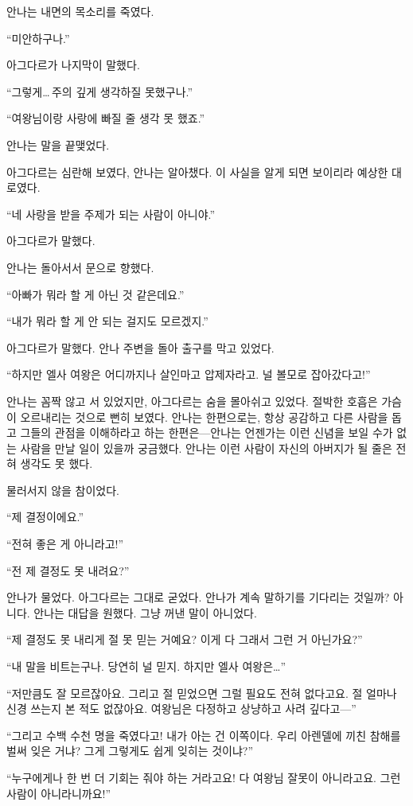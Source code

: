 안나는 내면의 목소리를 죽였다.

``미안하구나.''

아그다르가 나지막이 말했다.

``그렇게\ldots\,주의 깊게 생각하질 못했구나.''

``여왕님이랑 사랑에 빠질 줄 생각 못 했죠.''

안나는 말을 끝맺었다.

아그다르는 심란해 보였다, 안나는 알아챘다. 이 사실을 알게 되면 보이리라 예상한 대로였다.

``네 사랑을 받을 주제가 되는 사람이 아니야.''

아그다르가 말했다.

안나는 돌아서서 문으로 향했다.

``아빠가 뭐라 할 게 아닌 것 같은데요.''

``내가 뭐라 할 게 안 되는 걸지도 모르겠지.''

아그다르가 말했다. 안나 주변을 돌아 출구를 막고 있었다.

``하지만 엘사 여왕은 어디까지나 살인마고 압제자라고. 널 볼모로 잡아갔다고!''

안나는 꼼짝 않고 서 있었지만, 아그다르는 숨을 몰아쉬고 있었다. 절박한 호흡은 가슴이 오르내리는 것으로 뻔히 보였다. 안나는 한편으로는, 항상 공감하고 다른 사람을 돕고 그들의 관점을 이해하라고 하는 한편은—안나는 언젠가는 이런 신념을 보일 수가 없는 사람을 만날 일이 있을까 궁금했다. 안나는 이런 사람이 자신의 아버지가 될 줄은 전혀 생각도 못 했다.

물러서지 않을 참이었다.

``제 결정이에요.''

``전혀 좋은 게 아니라고!''

``전 제 결정도 못 내려요?''

안나가 물었다. 아그다르는 그대로 굳었다. 안나가 계속 말하기를 기다리는 것일까? 아니다. 안나는 대답을 원했다. 그냥 꺼낸 말이 아니었다.

``제 결정도 못 내리게 절 못 믿는 거예요? 이게 다 그래서 그런 거 아닌가요?''

``내 말을 비트는구나. 당연히 널 믿지. 하지만 엘사 여왕은\ldots''

``저만큼도 잘 모르잖아요. 그리고 절 믿었으면 그럴 필요도 전혀 없다고요. 절 얼마나 신경 쓰는지 본 적도 없잖아요. 여왕님은 다정하고 상냥하고 사려 깊다고—''

``그리고 수백 수천 명을 죽였다고! 내가 아는 건 이쪽이다. 우리 아렌델에 끼친 참해를 벌써 잊은 거냐? 그게 그렇게도 쉽게 잊히는 것이냐?''

``누구에게나 한 번 더 기회는 줘야 하는 거라고요! 다 여왕님 잘못이 아니라고요. 그런 사람이 아니라니까요!''

